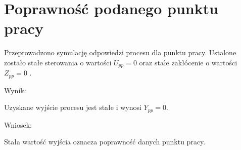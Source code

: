 \section{Poprawność podanego punktu pracy}

Przeprowadzono symulację odpowiedzi procesu dla punktu pracy. 
Ustalone zostało stałe sterowania o wartości $U_{pp} = 0$ oraz stałe zakłócenie o wartości $Z_{pp}=0$ .



Wynik: 

Uzyskane wyjście procesu jest stałe i wynosi $Y_{pp}=0$.

Wniosek: 

Stała wartość wyjścia oznacza poprawność danych punktu pracy.
